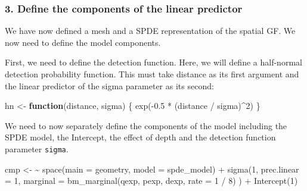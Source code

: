 \documentclass[
  letterpaper,
  DIV=11,
  numbers=noendperiod]{scrartcl}
\newenvironment{Shaded}{\begin{snugshade}}{\end{snugshade}}
\newcommand{\AttributeTok}[1]{\textcolor[rgb]{0.40,0.45,0.13}{#1}}
\newcommand{\ControlFlowTok}[1]{\textcolor[rgb]{0.00,0.23,0.31}{\textbf{#1}}}
\newcommand{\DecValTok}[1]{\textcolor[rgb]{0.68,0.00,0.00}{#1}}
\newcommand{\ErrorTok}[1]{\textcolor[rgb]{0.68,0.00,0.00}{#1}}
\newcommand{\FloatTok}[1]{\textcolor[rgb]{0.68,0.00,0.00}{#1}}
\newcommand{\FunctionTok}[1]{\textcolor[rgb]{0.28,0.35,0.67}{#1}}
\newcommand{\NormalTok}[1]{\textcolor[rgb]{0.00,0.23,0.31}{#1}}
\newcommand{\OtherTok}[1]{\textcolor[rgb]{0.00,0.23,0.31}{#1}}
\newcommand{\SpecialCharTok}[1]{\textcolor[rgb]{0.37,0.37,0.37}{#1}}
\begin{document}
\begin{tcolorbox}
\end{tcolorbox}

\subsubsection{3. Define the components of the linear
predictor}\label{define-the-components-of-the-linear-predictor}

We have now defined a mesh and a SPDE representation of the spatial GF.
We now need to define the model components.

First, we need to define the detection function. Here, we will define a
half-normal detection probability function. This must take distance as
its first argument and the linear predictor of the sigma parameter as
its second:

\begin{Shaded}
\begin{Highlighting}[]
\NormalTok{hn }\OtherTok{\textless{}{-}} \ControlFlowTok{function}\NormalTok{(distance, sigma) \{}
  \FunctionTok{exp}\NormalTok{(}\SpecialCharTok{{-}}\FloatTok{0.5} \SpecialCharTok{*}\NormalTok{ (distance }\SpecialCharTok{/}\NormalTok{ sigma)}\SpecialCharTok{\^{}}\DecValTok{2}\NormalTok{)}
\NormalTok{\}}
\end{Highlighting}
\end{Shaded}

We need to now separately define the components of the model including
the SPDE model, the Intercept, the effect of depth and the detection
function parameter \texttt{sigma}.

\begin{Shaded}
\begin{Highlighting}[]
\NormalTok{cmp }\OtherTok{\textless{}{-}} \ErrorTok{\textasciitilde{}} \FunctionTok{space}\NormalTok{(}\AttributeTok{main =}\NormalTok{ geometry, }\AttributeTok{model =}\NormalTok{ spde\_model) }\SpecialCharTok{+}
  \FunctionTok{sigma}\NormalTok{(}\DecValTok{1}\NormalTok{,}
    \AttributeTok{prec.linear =} \DecValTok{1}\NormalTok{,}
    \AttributeTok{marginal =} \FunctionTok{bm\_marginal}\NormalTok{(qexp, pexp, dexp, }\AttributeTok{rate =} \DecValTok{1} \SpecialCharTok{/} \DecValTok{8}\NormalTok{)}
\NormalTok{  ) }\SpecialCharTok{+}
  \FunctionTok{Intercept}\NormalTok{(}\DecValTok{1}\NormalTok{)}
\end{Highlighting}
\end{Shaded}
\end{document}
